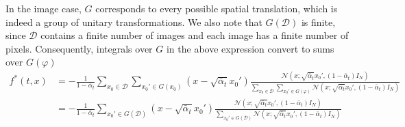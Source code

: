 \documentclass[a4paper,10pt]{article}
\theoremstyle{definition} %
\theoremstyle{definition} %
\theoremstyle{definition} %
\theoremstyle{definition} %
\newcommand{\0}{\boldsymbol{0}}
\renewcommand{\det}[1]{\mathrm{det}\left( #1 \right)}
\begin{document}
In the image case, $G$ corresponds to every possible spatial translation, which is indeed a group of unitary transformations. We also note that $G(\mathcal{D})$ is finite, since $\mathcal{D}$ contains a finite number of images and each image has a finite number of pixels. Consequently, integrals over $G$ in the above expression convert to sums over $G(\varphi)$ 
\begin{align*}
        f^*(t,x) &= -\frac{1}{1-\bar \alpha_t} \sum\limits_{x_0  \in \mathcal{D}} \sum\limits_{x_0' \in G(x_0)} (x - \sqrt{\bar \alpha_t} x_0') \frac{\mathcal{N}(x;\sqrt{\bar \alpha_t} x_0', (1-\bar \alpha_t) I_N) }{\sum\limits_{x_0  \in \mathcal{D}} \sum\limits_{x_0'\in G(\varphi)} \mathcal{N}(x;\sqrt{\bar \alpha_t} x_0', (1-\bar \alpha_t) I_N)}\\
        &= -\frac{1}{1-\bar \alpha_t}  \sum\limits_{x_0' \in G(\mathcal{D})} (x - \sqrt{\bar \alpha_t} x_0') \frac{\mathcal{N}(x;\sqrt{\bar \alpha_t} x_0', (1-\bar \alpha_t) I_N) }{ \sum\limits_{x_0'\in G(\mathcal{D})} \mathcal{N}(x;\sqrt{\bar \alpha_t} x_0', (1-\bar \alpha_t) I_N)}
\end{align*}
\end{document}
